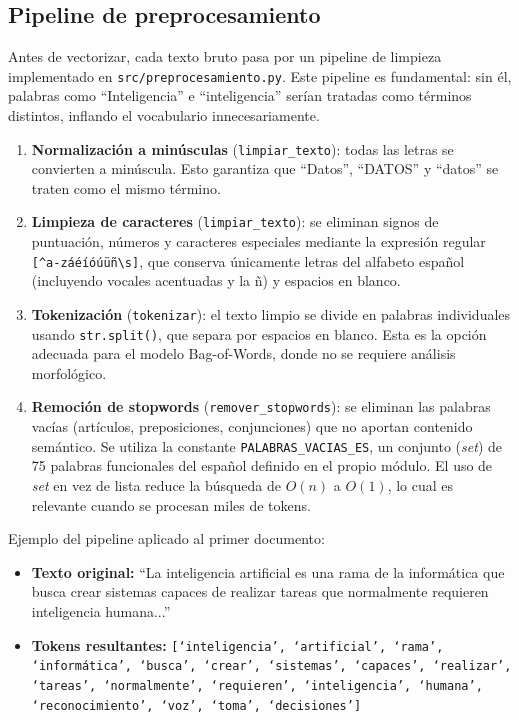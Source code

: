 \subsection{Pipeline de preprocesamiento}

Antes de vectorizar, cada texto bruto pasa por un pipeline de limpieza implementado en \texttt{src/preprocesamiento.py}. Este pipeline es fundamental: sin él, palabras como ``Inteligencia'' e ``inteligencia'' serían tratadas como términos distintos, inflando el vocabulario innecesariamente.

\begin{enumerate}
    \item \textbf{Normalización a minúsculas} (\texttt{limpiar\_texto}): todas las letras se convierten a minúscula. Esto garantiza que ``Datos'', ``DATOS'' y ``datos'' se traten como el mismo término.
    
    \item \textbf{Limpieza de caracteres} (\texttt{limpiar\_texto}): se eliminan signos de puntuación, números y caracteres especiales mediante la expresión regular \texttt{[\^{}a-záéíóúüñ\textbackslash{}s]}, que conserva únicamente letras del alfabeto español (incluyendo vocales acentuadas y la ñ) y espacios en blanco.
    
    \item \textbf{Tokenización} (\texttt{tokenizar}): el texto limpio se divide en palabras individuales usando \texttt{str.split()}, que separa por espacios en blanco. Esta es la opción adecuada para el modelo Bag-of-Words, donde no se requiere análisis morfológico.
    
    \item \textbf{Remoción de stopwords} (\texttt{remover\_stopwords}): se eliminan las palabras vacías (artículos, preposiciones, conjunciones) que no aportan contenido semántico. Se utiliza la constante \texttt{PALABRAS\_VACIAS\_ES}, un conjunto (\textit{set}) de 75 palabras funcionales del español definido en el propio módulo. El uso de \textit{set} en vez de lista reduce la búsqueda de $O(n)$ a $O(1)$, lo cual es relevante cuando se procesan miles de tokens.
\end{enumerate}

Ejemplo del pipeline aplicado al primer documento:

\begin{itemize}
    \item \textbf{Texto original:} ``La inteligencia artificial es una rama de la informática que busca crear sistemas capaces de realizar tareas que normalmente requieren inteligencia humana...''
    \item \textbf{Tokens resultantes:} \texttt{[`inteligencia', `artificial', `rama', `informática', `busca', `crear', `sistemas', `capaces', `realizar', `tareas', `normalmente', `requieren', `inteligencia', `humana', `reconocimiento', `voz', `toma', `decisiones']}
\end{itemize}

